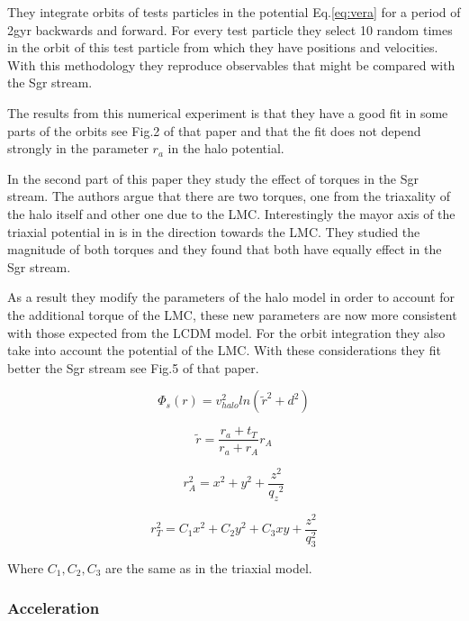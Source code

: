 They integrate orbits of tests particles in the potential Eq.\ref{eq:vera} for a period 
of 2gyr backwards and forward. For every test particle they select 10 random times in the 
orbit of this test particle from which they have positions and velocities. 
 With this methodology they reproduce observables that might be compared with the Sgr stream. 

The results from this numerical experiment is that they have a good fit in some 
parts of the orbits see Fig.2 of that paper and that the fit does not depend
strongly in the parameter $r_a$ in the halo potential. 

In the second part of this paper they study the effect of torques in the Sgr 
stream. The authors argue that there are two torques, one from the triaxality 
of the halo itself and other one due to the LMC. Interestingly the mayor 
axis of the triaxial potential in \citep{Law10} is in the direction towards 
 the LMC. They studied the magnitude of both torques and they found that both 
have equally effect in the Sgr stream. 

As a result they modify the parameters of the halo model in order to account 
for the additional torque of the LMC, these new parameters are now more consistent
 with those expected from the LCDM model. For the orbit integration they also take 
into account the potential of the LMC. With these considerations they fit better the Sgr
stream see Fig.5 of that paper.	


\begin{equation}\label{ref:vera}
\Phi_s(r) = v_{halo}^2 ln(\tilde{r}^2 + d^2)
\end{equation}

\begin{equation}
\tilde{r} = \dfrac{r_a + t_T}{r_a + r_A}r_A
\end{equation}

\begin{equation}
r_A^2 = x^2 + y^2 + \dfrac{z^2}{{q_z}^2} 
\end{equation}

\begin{equation}
r_T ^ 2 = C_1 x^2 + C_2 y^2 + C_3 xy + \dfrac{z^2}{q_3^2}
\end{equation}

Where $C_1, C_2, C_3$ are the same as in the triaxial model. 

\subsubsection{Acceleration}


